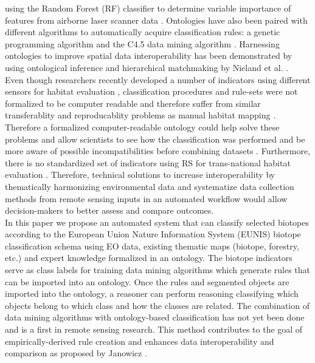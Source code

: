 \documentclass[authoryear, review,12pt,number]{elsarticle}
\begin{document}
using the Random Forest (RF) classifier to determine variable importance of
features from airborne laser scanner data \citep{Belgiu2014}. Ontologies have
also been paired with different algorithms to automatically acquire
classification rules: a genetic programming algorithm
\citep{Forestier2012470} and the C4.5 data mining algorithm
\citep{Sheeren2006ML}. Harnessing ontologies to improve spatial data
interoperability has been demonstrated by using ontological inference and
hierarchical matchmaking by Nieland et al. \citep{Nieland2015}. 
\\
Even though researchers recently developed a number of indicators using
different sensors for habitat evaluation \citep{Nagendra2013}, classification
procedures and rule-sets were not formalized to be computer readable and
therefore suffer from similar transferablity and reproducablity problems as
manual habitat mapping \citep{Arvor2013, Nieland2015}.
Therefore a formalized computer-readable ontology could help solve these
problems and allow scientists to see how the classification was performed and be
more aware of possible incompatibilities before combining datasets
\citep{Janowicz2012}. 
Furthermore, there is no standardized set of indicators
using RS for trans-national habitat evaluation \citep{Lucas2015}. Therefore,
technical solutions to increase interoperability by thematically harmonizing
environmental data and systematize data collection methods from remote sensing
inputs in an automated workflow would allow decision-makers to better assess and
compare outcomes.
\\
In this paper we propose an automated system that can
classify selected biotopes according to the European Union Nature Information
System (EUNIS) biotope classification schema using EO data, existing
thematic maps (biotope, forestry, etc.) and expert knowledge formalized in an
ontology. The biotope indicators serve as class labels for training data mining
algorithms which generate rules that can be imported into an ontology. Once the
rules and segmented objects are imported into the ontology, a reasoner can
perform reasoning classifying which objects belong to which class and how the
classes are related. The combination of data mining algorithms with
ontology-based classification has not yet been done and is a first in remote
sensing research. This method contributes to the goal of empirically-derived
rule creation and enhances data interoperability and comparison as proposed by
Janowicz \citep{Janowicz2012}.
\end{document}
